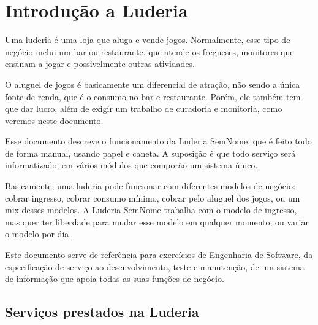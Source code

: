 \chapter{Introdução a Luderia}
\label{chap:intro}

Uma luderia é uma loja que aluga e vende jogos. Normalmente, esse tipo de negócio inclui um bar ou restaurante, que atende os fregueses, monitores que ensinam a jogar e possivelmente outras atividades. 

O aluguel de jogos é basicamente um diferencial de atração, não sendo a única fonte de renda, que é o consumo no bar e restaurante. Porém, ele também tem que dar lucro, além de exigir um trabalho de curadoria e monitoria, como veremos neste documento.

Esse documento descreve o funcionamento da Luderia SemNome, que é feito todo de forma manual, usando papel e caneta. A suposição é que todo serviço será informatizado, em vários módulos que comporão um sistema único.

Basicamente, uma luderia pode funcionar com diferentes modelos de negócio: cobrar ingresso, cobrar consumo mínimo, cobrar pelo aluguel dos jogos, ou um mix desses modelos. A Luderia SemNome trabalha com o modelo de ingresso, mas quer ter liberdade para mudar esse modelo em qualquer momento, ou variar o modelo por dia.

Este documento serve de referência para exercícios de Engenharia de Software, da especificação de serviço ao desenvolvimento, teste e manutenção, de um sistema de informação que apoia todas as suas funções de negócio.

\section{Serviços prestados na Luderia}

